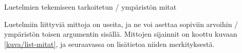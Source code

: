 {
}{
  \caption{Luetelmien tekemiseen tarkoitetun \-/
    ympäristön mitat}
  \label{kuva/list-mitat}
}

Luetelmiin liittyviä mittoja on useita, ja ne voi asettaa sopiviin
arvoihin \-/ ympäristön toisen argumentin sisällä.
Mittojen sijainnit on koottu kuvaan \ref{kuva/list-mitat}, ja
seuraavassa on lisätietoa niiden merkityksestä.

